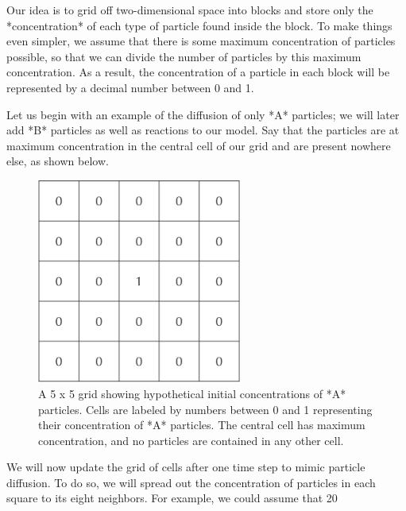 {Our idea is to grid off two-dimensional space into blocks and store only the *concentration* of each type of particle found inside the block. To make things even simpler, we assume that there is some maximum concentration of particles possible, so that we can divide the number of particles by this maximum concentration. As a result, the concentration of a particle in each block will be represented by a decimal number between 0 and 1.

Let us begin with an example of the diffusion of only *A* particles; we will later add *B* particles as well as reactions to our model. Say that the particles are at maximum concentration in the central cell of our grid and are present nowhere else, as shown below.

\begin{figure}[h]
\centering
\mySfFamily
\includegraphics[width = 0.6\textwidth]{../assets/images/600px/initial_A_concentration.png}
\caption{A 5 x 5 grid showing hypothetical initial concentrations of *A* particles. Cells are labeled by numbers between 0 and 1 representing their concentration of *A* particles. The central cell has maximum concentration, and no particles are contained in any other cell.}
\label{fig:initial_A_concentration}
\end{figure}

We will now update the grid of cells after one time step to mimic particle diffusion. To do so, we will spread out the concentration of particles in each square to its eight neighbors. For example, we could assume that 20%

}
